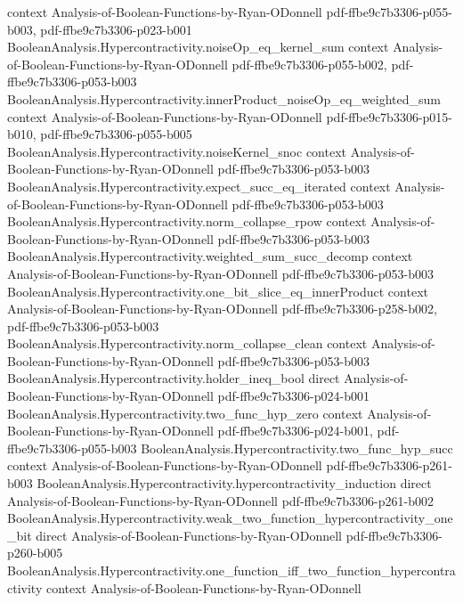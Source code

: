 \begin{theorem}
  {context}
  {Analysis-of-Boolean-Functions-by-Ryan-ODonnell}
  {pdf-ffbe9c7b3306-p055-b003,
    pdf-ffbe9c7b3306-p023-b001}
\proofstep
  {BooleanAnalysis.Hypercontractivity.noiseOp_eq_kernel_sum}
  {context}
  {Analysis-of-Boolean-Functions-by-Ryan-ODonnell}
  {pdf-ffbe9c7b3306-p055-b002,
    pdf-ffbe9c7b3306-p053-b003}
\proofstep
  {BooleanAnalysis.Hypercontractivity.innerProduct_noiseOp_eq_weighted_sum}
  {context}
  {Analysis-of-Boolean-Functions-by-Ryan-ODonnell}
  {pdf-ffbe9c7b3306-p015-b010,
    pdf-ffbe9c7b3306-p055-b005}
\proofstep
  {BooleanAnalysis.Hypercontractivity.noiseKernel_snoc}
  {context}
  {Analysis-of-Boolean-Functions-by-Ryan-ODonnell}
  {pdf-ffbe9c7b3306-p053-b003}
\proofstep
  {BooleanAnalysis.Hypercontractivity.expect_succ_eq_iterated}
  {context}
  {Analysis-of-Boolean-Functions-by-Ryan-ODonnell}
  {pdf-ffbe9c7b3306-p053-b003}
\proofstep
  {BooleanAnalysis.Hypercontractivity.norm_collapse_rpow}
  {context}
  {Analysis-of-Boolean-Functions-by-Ryan-ODonnell}
  {pdf-ffbe9c7b3306-p053-b003}
\proofstep
  {BooleanAnalysis.Hypercontractivity.weighted_sum_succ_decomp}
  {context}
  {Analysis-of-Boolean-Functions-by-Ryan-ODonnell}
  {pdf-ffbe9c7b3306-p053-b003}
\proofstep
  {BooleanAnalysis.Hypercontractivity.one_bit_slice_eq_innerProduct}
  {context}
  {Analysis-of-Boolean-Functions-by-Ryan-ODonnell}
  {pdf-ffbe9c7b3306-p258-b002,
    pdf-ffbe9c7b3306-p053-b003}
\proofstep
  {BooleanAnalysis.Hypercontractivity.norm_collapse_clean}
  {context}
  {Analysis-of-Boolean-Functions-by-Ryan-ODonnell}
  {pdf-ffbe9c7b3306-p053-b003}
\proofstep
  {BooleanAnalysis.Hypercontractivity.holder_ineq_bool}
  {direct}
  {Analysis-of-Boolean-Functions-by-Ryan-ODonnell}
  {pdf-ffbe9c7b3306-p024-b001}
\proofstep
  {BooleanAnalysis.Hypercontractivity.two_func_hyp_zero}
  {context}
  {Analysis-of-Boolean-Functions-by-Ryan-ODonnell}
  {pdf-ffbe9c7b3306-p024-b001,
    pdf-ffbe9c7b3306-p055-b003}
\proofstep
  {BooleanAnalysis.Hypercontractivity.two_func_hyp_succ}
  {context}
  {Analysis-of-Boolean-Functions-by-Ryan-ODonnell}
  {pdf-ffbe9c7b3306-p261-b003}
\proofstep
  {BooleanAnalysis.Hypercontractivity.hypercontractivity_induction}
  {direct}
  {Analysis-of-Boolean-Functions-by-Ryan-ODonnell}
  {pdf-ffbe9c7b3306-p261-b002}
\proofstep
  {BooleanAnalysis.Hypercontractivity.weak_two_function_hypercontractivity_one_bit}
  {direct}
  {Analysis-of-Boolean-Functions-by-Ryan-ODonnell}
  {pdf-ffbe9c7b3306-p260-b005}
\proofstep
  {BooleanAnalysis.Hypercontractivity.one_function_iff_two_function_hypercontractivity}
  {context}
  {Analysis-of-Boolean-Functions-by-Ryan-ODonnell}

\end{theorem}
